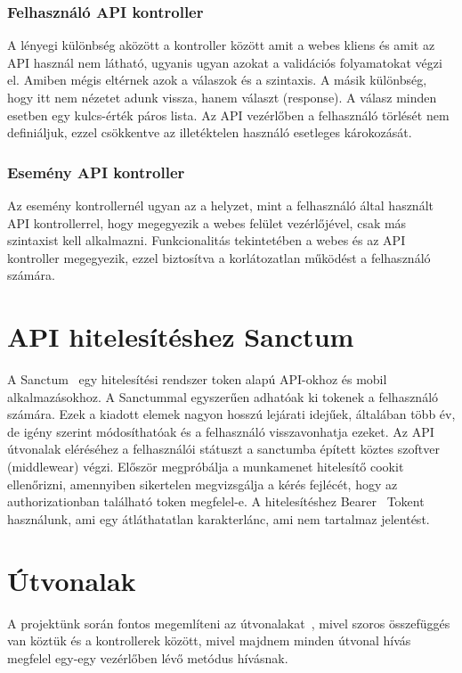 \documentclass[
]{thesis-ekf}
\theoremstyle{definition}
\theoremstyle{remark}
\begin{document}
\subsubsection{Felhasználó API kontroller}

A lényegi különbség aközött a kontroller között amit a webes kliens és amit az API használ nem látható, ugyanis ugyan azokat a validációs folyamatokat végzi el. Amiben mégis eltérnek azok a válaszok és a szintaxis. A másik különbség, hogy itt nem nézetet adunk vissza, hanem választ (response). A válasz minden esetben egy kulcs-érték páros lista.
Az API vezérlőben a felhasználó törlését nem definiáljuk, ezzel csökkentve az illetéktelen használó esetleges károkozását. 

\subsubsection{Esemény API kontroller}

Az esemény kontrollernél ugyan az a helyzet, mint a felhasználó által használt API kontrollerrel, hogy megegyezik a webes felület vezérlőjével, csak más szintaxist kell alkalmazni. Funkcionalitás tekintetében a webes és az API kontroller megegyezik, ezzel biztosítva a korlátozatlan működést a felhasználó számára.

\section{API hitelesítéshez Sanctum}

A Sanctum~\cite{laravel_sanctum} egy hitelesítési rendszer token alapú API-okhoz és mobil alkalmazásokhoz. A Sanctummal egyszerűen adhatóak ki tokenek a felhasználó számára. Ezek a kiadott elemek nagyon hosszú lejárati idejűek, általában több év, de igény szerint módosíthatóak és a felhasználó visszavonhatja ezeket. Az API útvonalak eléréséhez a felhasználói státuszt a sanctumba épített köztes szoftver (middlewear) végzi. Először megpróbálja a munkamenet hitelesítő cookit ellenőrizni, amennyiben sikertelen megvizsgálja a kérés fejlécét, hogy az authorizationban található token megfelel-e. A hitelesítéshez Bearer~\cite{bearer_token} Tokent használunk, ami egy átláthatatlan karakterlánc, ami nem tartalmaz jelentést.

\section{Útvonalak}
A projektünk során fontos megemlíteni az útvonalakat~\cite{laravel_route}, mivel szoros összefüggés van köztük és a kontrollerek között, mivel majdnem minden útvonal hívás megfelel egy-egy vezérlőben lévő metódus hívásnak. 
\end{document}

